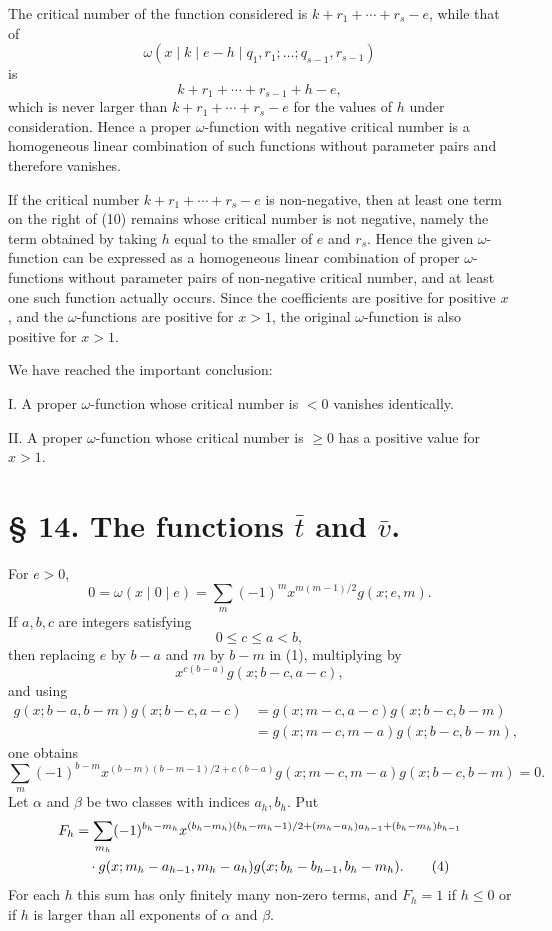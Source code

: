 The critical number of the function considered is $k+r_1+\cdots+r_s-e$, while that of
\[
 \omega(x\mid k\mid e-h\mid q_1,r_1;\ldots;q_{s-1},r_{s-1})
\]
is
\[
 k+r_1+\cdots+r_{s-1}+h-e,
\]
which is never larger than $k+r_1+\cdots+r_s-e$ for the values of $h$ under consideration. Hence a proper $\omega$-function with negative critical number is a homogeneous linear combination of such functions without parameter pairs and therefore vanishes.

If the critical number $k+r_1+\cdots+r_s-e$ is non-negative, then at least one term on the right of (10) remains whose critical number is not negative, namely the term obtained by taking $h$ equal to the smaller of $e$ and $r_s$. Hence the given $\omega$-function can be expressed as a homogeneous linear combination of proper $\omega$-functions without parameter pairs of non-negative critical number, and at least one such function actually occurs. Since the coefficients are positive for positive $x$, and the $\omega$-functions are positive for $x>1$, the original $\omega$-function is also positive for $x>1$.

We have reached the important conclusion:

I. A proper $\omega$-function whose critical number is $<0$ vanishes identically.

II. A proper $\omega$-function whose critical number is $\ge0$ has a positive value for $x>1$.

\section*{§ 14. The functions $\bar t$ and $\bar v$.}

For $e>0$,
\begin{equation}
 0=\omega(x\mid0\mid e)=\sum_m(-1)^m x^{m(m-1)/2}g(x;e,m).
\tag{1}
\end{equation}
If $a,b,c$ are integers satisfying
\begin{equation}
 0\le c\le a<b,
\tag{2}
\end{equation}
then replacing $e$ by $b-a$ and $m$ by $b-m$ in (1), multiplying by
\[
 x^{c(b-a)}g(x;b-c,a-c),
\]
and using
\begin{align*}
 g(x;b-a,b-m)g(x;b-c,a-c)
 &=g(x;m-c,a-c)g(x;b-c,b-m)\\
 &=g(x;m-c,m-a)g(x;b-c,b-m),
\end{align*}
one obtains
\begin{equation}
 \sum_m(-1)^{b-m}x^{(b-m)(b-m-1)/2+c(b-a)}
 g(x;m-c,m-a)g(x;b-c,b-m)=0.
\tag{3}
\end{equation}
Let $\alpha$ and $\beta$ be two classes with indices $a_h,b_h$. Put
\begin{align}
F_h&=\sum_{m_h}(-1)^{b_h-m_h}
 x^{(b_h-m_h)(b_h-m_h-1)/2+(m_h-a_h)a_{h-1}+(b_h-m_h)b_{h-1}}\notag\\
&\quad\cdot g(x;m_h-a_{h-1},m_h-a_h)g(x;b_h-b_{h-1},b_h-m_h).
\tag{4}
\end{align}
For each $h$ this sum has only finitely many non-zero terms, and $F_h=1$ if $h\le0$ or if $h$ is larger than all exponents of $\alpha$ and $\beta$.

